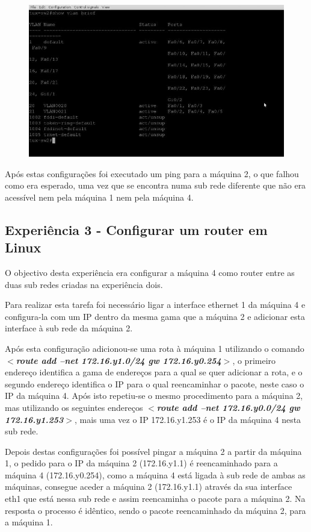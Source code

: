 \documentclass[a4paper]{article}
\begin{document}
\begin{figure}[h!]
\centering
\includegraphics[scale=0.3]{res/image3.jpg}
\end{figure}

Após estas configurações foi executado um ping para a máquina 2, o que falhou como era esperado, uma vez que se encontra numa sub rede diferente que não era acessível nem pela máquina 1 nem pela máquina 4.

\subsection{Experiência 3 - Configurar um router em Linux}
O objectivo desta experiência era configurar a máquina 4 como router entre as duas sub redes criadas na experiência dois.

Para realizar esta tarefa foi necessário ligar a interface ethernet 1 da máquina 4 e configura-la com um IP dentro da mesma gama que a máquina 2 e adicionar esta interface à sub rede da máquina 2.

Após esta configuração adicionou-se uma rota à máquina 1 utilizando o comando \textbf{\textit{$<$route add –net  172.16.y1.0/24 gw 172.16.y0.254$>$}}, o primeiro endereço identifica a gama de endereços para a qual se quer adicionar a rota, e o segundo endereço identifica o IP para o qual reencaminhar o pacote, neste caso o IP da máquina 4. Após isto repetiu-se o mesmo procedimento para a máquina 2, mas utilizando os seguintes endereços \textbf{\textit{$<$route add –net 172.16.y0.0/24 gw 172.16.y1.253$>$}}, mais uma vez o IP 172.16.y1.253 é o IP da máquina 4 nesta sub rede.

Depois destas configurações foi possível pingar a máquina 2 a partir da máquina 1, o pedido para o IP da máquina 2 (172.16.y1.1) é reencaminhado para a máquina 4 (172.16.y0.254), como a máquina 4 está ligada à sub rede de ambas as máquinas, consegue aceder a máquina 2 (172.16.y1.1) através da sua interface eth1 que está nessa sub rede e assim reencaminha o pacote para a máquina 2. Na resposta o processo é idêntico, sendo o pacote reencaminhado da máquina 2, para a máquina 1.
\end{document}
